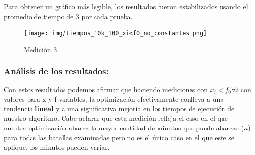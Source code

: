 Para obtener un gráfico más legible, los resultados fueron estabilizados usando el promedio de tiempo de 3 por cada prueba.

\begin{figure}[H]
    \centering
    \texttt{[image: img/tiempos\_10k\_100\_xi<f0\_no\_constantes.png]}
    \caption{Medición 3}
\end{figure}

\subsubsection{Análisis de los resultados:}
Con estos resultados podemos afirmar que haciendo mediciones con $x_i < f_0 \forall i $ con valores para x y f variables, la optimización efectivamente conlleva a una tendencia \textbf{lineal} y a una significativa mejoría en los tiempos de ejecución de nuestro algoritmo. Cabe aclarar que esta medición refleja el caso en el que nuestra optimización abarca la mayor cantidad de minutos que puede abarcar ($n$) para todas las batallas examinadas pero no es el único caso en el que este se aplique, los minutos pueden variar.
\newpage
